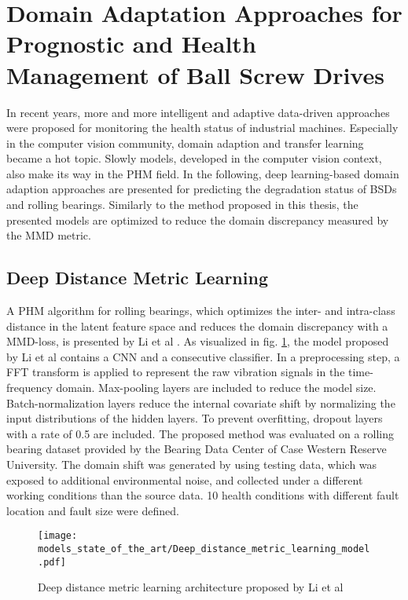 \section{Domain Adaptation Approaches for Prognostic and Health Management of Ball Screw Drives}
In recent years, more and more intelligent and adaptive data-driven approaches were proposed for monitoring the health status of industrial machines. Especially in the computer vision community, domain adaption and transfer learning became a hot topic. Slowly models, developed in the computer vision context, also make its way in the PHM field. In the following, deep learning-based domain adaption approaches are presented for predicting the degradation status of BSDs and rolling bearings. Similarly to the method proposed in this thesis, the presented models are optimized to reduce the domain discrepancy measured by the MMD metric.

\subsection{Deep Distance Metric Learning}
A PHM algorithm for rolling bearings, which optimizes the inter- and intra-class distance in the latent feature space and reduces the domain discrepancy with a MMD-loss, is presented by Li et al \cite{Li2018}. As visualized in fig. \ref{fig:Deep_distance_metric_learning_model}, the model proposed by Li et al contains a CNN and a consecutive classifier. In a preprocessing step, a FFT transform is applied to represent the raw vibration signals in the time-frequency domain. Max-pooling layers are included to reduce the model size. Batch-normalization layers reduce the internal covariate shift by normalizing the input distributions of the hidden layers. To prevent overfitting, dropout layers with a rate of 0.5 are included. The proposed method was evaluated on a rolling bearing dataset provided by the Bearing Data Center of Case Western Reserve University. The domain shift was generated by using testing data, which was exposed to additional environmental noise, and collected under a different working conditions than the source data. 10 health conditions with different fault location and fault size were defined. 

\begin{figure}[H]
  \centering
  \texttt{[image: models\_state\_of\_the\_art/Deep\_distance\_metric\_learning\_model.pdf]}
  \caption{Deep distance metric learning architecture proposed by Li et al \cite{Li2018}}
  \label{fig:Deep_distance_metric_learning_model}
\end{figure}

